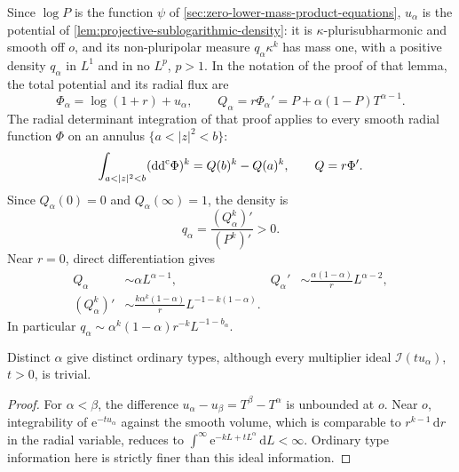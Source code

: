 Since $\log P$ is the function $\psi$ of \cref{sec:zero-lower-mass-product-equations}, $u_\alpha$ is the potential of \cref{lem:projective-sublogarithmic-density}: it is $\kappa$-plurisubharmonic and smooth off $o$, and its non-pluripolar measure $q_\alpha\kappa^k$ has mass one, with a positive density $q_\alpha$ in $L^1$ and in no $L^p$, $p>1$. In the notation of the proof of that lemma, the total potential and its radial flux are
\begin{equation}\label{eq:radial-residual-baseline}
 \Phi_\alpha=\log(1+r)+u_\alpha,\qquad
 Q_\alpha=r\Phi_\alpha'=P+\alpha(1-P)T^{\alpha-1}.
\end{equation}
The radial determinant integration of that proof applies to every smooth radial function $\Phi$ on an annulus $\{a<|z|^2<b\}$:
\begin{equation}\label{eq:radial-residual-flux}
 \int_{a<|z|^2<b}(\ddc\Phi)^k=Q(b)^k-Q(a)^k,
 \qquad Q=r\Phi'.
\end{equation}
Since $Q_\alpha(0)=0$ and $Q_\alpha(\infty)=1$, the density is
\begin{equation}\label{eq:radial-residual-baseline-density}
 q_\alpha=\frac{(Q_\alpha^k)'}{(P^k)'}>0.
\end{equation}
Near $r=0$, direct differentiation gives
\begin{align}\label{eq:radial-residual-asymptotics}
 Q_\alpha&\sim\alpha L^{\alpha-1},&
 Q_\alpha'&\sim\frac{\alpha(1-\alpha)}rL^{\alpha-2},\\
 (Q_\alpha^k)'&\sim
 \frac{k\alpha^k(1-\alpha)}rL^{-1-k(1-\alpha)}.\nonumber
\end{align}
In particular $q_\alpha\sim\alpha^k(1-\alpha)r^{-k}L^{-1-b_\alpha}$.

\begin{lemma}\label{lem:radial-nonlogarithmic-type}
Distinct $\alpha$ give distinct ordinary types, although every multiplier ideal $\mathcal I(tu_\alpha)$, $t>0$, is trivial.
\end{lemma}
\begin{proof}
For $\alpha<\beta$, the difference $u_\alpha-u_\beta=T^\beta-T^\alpha$ is unbounded at $o$. Near $o$, integrability of $\mathrm e^{-tu_\alpha}$ against the smooth volume, which is comparable to $r^{k-1}\,\mathrm dr$ in the radial variable, reduces to
$\int^\infty \mathrm{e}^{-kL+tL^\alpha}\,\mathrm{d}L<\infty$. Ordinary type information here is strictly finer than this ideal information.
\end{proof}

